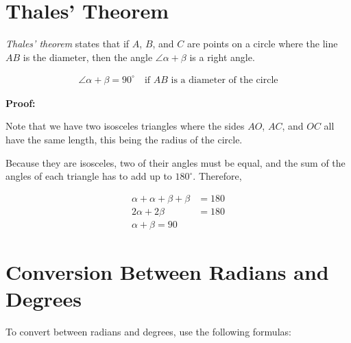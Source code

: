 \section{Thales' Theorem}

\emph{Thales' theorem} states that if \(A\), \(B\), and \(C\) are points on a circle where the line \( AB \) is the diameter, 
then the angle \( \angle  \alpha + \beta\) is a right angle.

\begin{align*}
	\angle \alpha + \beta = 90^\circ \quad \text{if } AB \text{ is a diameter of the circle}
\end{align*}

\begin{center}
\end{center}

\textbf{Proof:}

Note that we have two isosceles triangles where the sides \(AO\), \(AC\), and \(OC\) all have the same 
length, this being the radius of the circle.

Because they are isosceles, two of their angles must be equal, and the sum of the angles 
of each triangle has to add up to \(180^\circ\). Therefore,

\begin{align*}
	\alpha + \alpha + \beta + \beta &= 180 \\
	2 \alpha + 2\beta &= 180 \\
	\alpha + \beta = 90
\end{align*}

\QED

\section{Conversion Between Radians and Degrees}

To convert between radians and degrees, use the following formulas:

